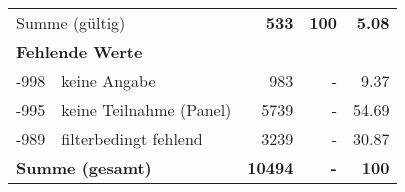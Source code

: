 \begin{longtable}{lXrrr}
     \midrule
     \multicolumn{2}{l}{Summe (gültig)} &
       \textbf{\num{533}} &
     \textbf{100} &
       \textbf{\num[round-mode=places,round-precision=2]{5,08}} \\
     \multicolumn{5}{l}{\textbf{Fehlende Werte}}\\
       -998 &
       keine Angabe &
         \num{983} &
        - &
         \num[round-mode=places,round-precision=2]{9,37} \\
       -995 &
       keine Teilnahme (Panel) &
         \num{5739} &
        - &
         \num[round-mode=places,round-precision=2]{54,69} \\
       -989 &
       filterbedingt fehlend &
         \num{3239} &
        - &
         \num[round-mode=places,round-precision=2]{30,87} \\
     \midrule
     \multicolumn{2}{l}{\textbf{Summe (gesamt)}} &
          \textbf{\num{10494}} &
        \textbf{-} &
        \textbf{100} \\
     \bottomrule
     \end{longtable}
     
